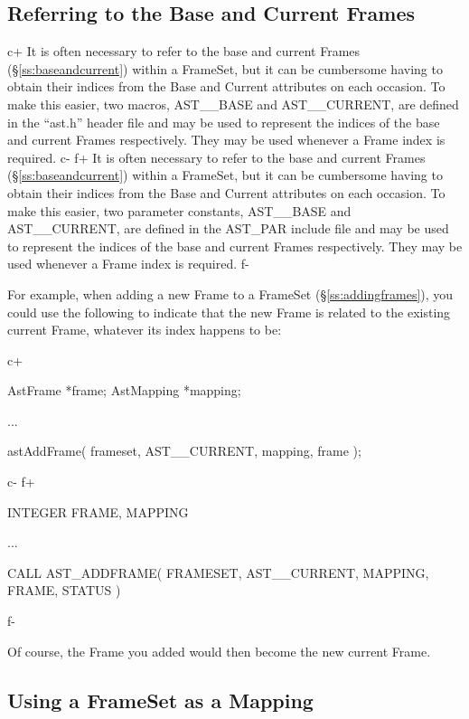 \documentclass[twoside,11pt]{starlink}
\providecommand{\secref}[1]{\S\ref{#1}}
\begin{document}
{\subsection{\label{ss:astbaseandastcurrent}Referring to the Base and Current Frames}

c+
It is often necessary to refer to the base and current Frames
(\secref{ss:baseandcurrent}) within a FrameSet, but it can be
cumbersome having to obtain their indices from the Base and Current
attributes on each occasion. To make this easier, two macros,
AST\_\_BASE and AST\_\_CURRENT, are defined in the ``ast.h'' header
file and may be used to represent the indices of the base and current
Frames respectively. They may be used whenever a Frame index is
required.
c-
f+
It is often necessary to refer to the base and current Frames
(\secref{ss:baseandcurrent}) within a FrameSet, but it can be
cumbersome having to obtain their indices from the Base and Current
attributes on each occasion. To make this easier, two parameter
constants, AST\_\_BASE and AST\_\_CURRENT, are defined in the AST\_PAR
include file and may be used to represent the indices of the base and
current Frames respectively. They may be used whenever a Frame index
is required.
f-

For example, when adding a new Frame to a FrameSet
(\secref{ss:addingframes}), you could use the following to indicate
that the new Frame is related to the existing current Frame, whatever
its index happens to be:

c+
\small
\begin{terminalv}
AstFrame *frame;
AstMapping *mapping;

...

astAddFrame( frameset, AST__CURRENT, mapping, frame );
\end{terminalv}
\normalsize
c-
f+
\small
\begin{terminalv}
      INTEGER FRAME, MAPPING

      ...

      CALL AST_ADDFRAME( FRAMESET, AST__CURRENT, MAPPING, FRAME, STATUS )
\end{terminalv}
\normalsize
f-

Of course, the Frame you added would then become the new current
Frame.

\subsection{\label{ss:framesetasmapping}Using a FrameSet as a Mapping}

}
\end{document}

